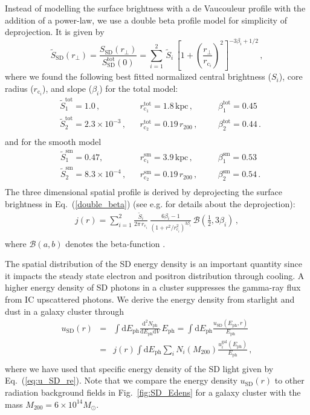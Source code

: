 \documentclass[10pt,aps,pra,reprint,amsmath,amsfonts,amssymb,showpacs,nofootinbib,floatfix]{revtex4-1}
\newcommand{\rmn}{\mathrm}
\newcommand{\ph}{\rmn{ph}}
\newcommand{\eph}{E_\ph}
\newcommand{\gal}{\rmn{gal}}
\newcommand{\sd}{\rmn{SD}}
\newcommand{\msun}{M_\odot}
\newcommand{\dd}{\rmn{d}}
\newcommand{\rvir}{r_{200}}
\newcommand{\mvir}{M_{200}}
\begin{document}
Instead of modelling the surface brightness with a de Vaucouleur
profile with the addition of a power-law, we use a double beta profile
model for simplicity of deprojection. It is given by
\begin{equation}
\tilde{S}_\sd (r_\bot) = \frac{S_\sd (r_\bot)}{S_\rmn{SD}^\rmn{tot}(0)} = 
\sum_{i=1}^2 \,\tilde{S}_i\, 
\left[1 + \left( \frac{r_\bot}{r_{\mathrm{c}_i}}\right)^2\right]
^{-3\beta_i + 1/2}\,,
\label{double_beta}
\end{equation}
where we found the following best fitted normalized central brightness
($S_i$), core radius ($r_{\mathrm{c}_i}$), and slope ($\beta_i$) for
the total model:
\begin{align}
&\tilde{S}_1^\rmn{tot} = 1.0\,,
&&r_{\mathrm{c}_1}^\rmn{tot} = 1.8\,\rmn{kpc}\,,
&&&\beta_1^\rmn{tot} = 0.45\, \nonumber\\
&\tilde{S}_2^\rmn{tot} = 2.3\times10^{-3}\,,
&&r_{\mathrm{c}_2}^\rmn{tot} = 0.19\,\rvir\,,
&&&\beta_2^\rmn{tot} = 0.44\,.\nonumber\\
& && &&&
\label{fit_spatial_IR}
\end{align}
and for the smooth model
\begin{align}
&\tilde{S}_1^\rmn{sm}=0.47,\,
&&r_{\mathrm{c}_1}^\rmn{sm}=3.9\,\rmn{kpc}\,,
&&&\beta_1^\rmn{sm}=0.53 \,\nonumber\\
&\tilde{S}_2^\rmn{sm}=8.3\times10^{-4}\,,
&&r_{\mathrm{c}_2}^\rmn{sm}=0.19\,\rvir\,,
&&&\beta_2^\rmn{sm}=0.54\,.\nonumber\\
& && &&&
\label{fit_spatial_IR_sm}
\end{align}
The three dimensional spatial profile is derived by deprojecting the
surface brightness in Eq.~(\ref{double_beta}) (see
e.g. \cite{2004A&A...413...17P} for details about the deprojection):
\begin{eqnarray}
  j(r)  = \sum_{i=1}^2 \frac{\tilde{S}_i}{2\pi\,r_{\mathrm{c}_i}}\,
  \frac{6 \beta_i - 1}{\left(1 + r^2/r^2_{\mathrm{c}_i}\right)^{3\beta_i}}\,
  \mathcal{B}\left(\frac{1}{2},3\beta_i\right)\,,\nonumber\\
\end{eqnarray}
where $\mathcal{B}(a,b)$ denotes the beta-function
\cite{1965hmfw.book.....A}.

The spatial distribution of the SD energy density is an important
quantity since it impacts the steady state electron and positron
distribution through cooling. A higher energy density of SD photons in
a cluster suppresses the gamma-ray flux from IC upscattered
photons. We derive the energy density from starlight and dust in a
galaxy cluster through
\begin{eqnarray}
\label{eq:U_SD_r}
u_\sd(r) &=& \int \dd \eph \frac{\dd^2 N_\ph}{\dd \eph \dd V}\,\eph
=\int \dd \eph \frac{u_\sd(\eph, r)}{\eph}
\nonumber \\
&=&  j(r)  \int \dd \eph \sum_i 
N_i(\mvir) \frac{u_i^\gal(\eph)}{\eph}\,, \nonumber \\
\end{eqnarray}
where we have used that specific energy density of the SD light given
by Eq.~(\ref{eq:u_SD_re}). Note that we compare the energy density
$u_\sd(r)$ to other radiation background fields in
Fig.~\ref{fig:SD_Edens} for a galaxy cluster with the mass
$\mvir=6\times10^{14}\msun$.
\end{document}
